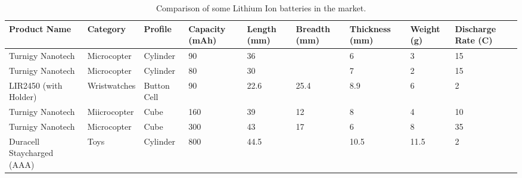 \begin{landscape}
\begin{table}[h]
\centering
\begin{tabular}{@{}lllllllll@{}}
\toprule
Product Name               & Category     & Profile     & Capacity (mAh) & Length (mm) & Breadth (mm) & Thickness (mm) & Weight (g) & Discharge Rate (C) \\ \midrule
Turnigy Nanotech           & Microcopter  & Cylinder    & 90             & 36          &              & 6              & 3          & 15                 \\
Turnigy Nanotech           & Microcopter  & Cylinder    & 80             & 30          &              & 7              & 2          & 15                 \\
LIR2450 (with Holder)      & Wristwatches & Button Cell & 90             & 22.6        & 25.4         & 8.9            & 6          & 2                  \\
Turnigy Nanotech           & Miicrocopter & Cube        & 160            & 39          & 12           & 8              & 4          & 10                 \\
Turnigy Nanotech           & Microcopter  & Cube        & 300            & 43          & 17           & 6              & 8          & 35                 \\
Duracell Staycharged (AAA) & Toys         & Cylinder    & 800            & 44.5        &              & 10.5           & 11.5       & 2                  \\ \bottomrule
\end{tabular}
\caption{Comparison of some Lithium Ion batteries in the market.}
\label{Tab:Battery2}
\end{table}
\end{landscape}